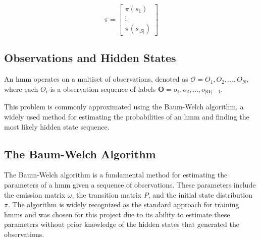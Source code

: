 \[
    \pi = \begin{bmatrix}
              \pi(s_1) \\
              \vdots   \\
              \pi(s_{|S|})
    \end{bmatrix}
\]

\subsection{Observations and Hidden States}\label{subsec:observations-hidden-states}





An \gls{hmm} operates on a multiset of observations, denoted as  $\mathcal{O} = {O_1, O_2, \ldots, O_N}$, where each $O_i$ is a observation sequence of labels $\mathbf{O} = o_1, o_2, \ldots, o_{|\mathbf{O}|-1}$.






This problem is commonly approximated using the Baum-Welch algorithm, a widely used method for estimating the probabilities of an \gls{hmm} and finding the most likely hidden state sequence.


\subsection{The Baum-Welch Algorithm}\label{subsec:baum-welch}
The Baum-Welch algorithm is a fundamental method for estimating the parameters of a \gls{hmm} given a sequence of observations.
These parameters include the emission matrix $\omega$, the transition matrix $P$, and the initial state distribution $\pi$.
The algorithm is widely recognized as the standard approach for training \glspl{hmm} and was chosen for this project due to its ability to estimate these parameters without prior knowledge of the hidden states that generated the observations.

